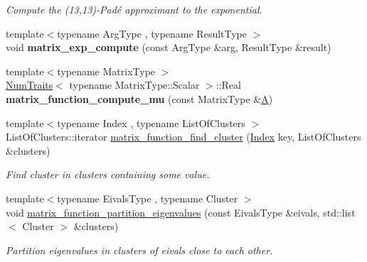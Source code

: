 \begin{DoxyCompactItemize}
\begin{DoxyCompactList}\small\item\em Compute the (13,13)-\/\+Pad\'{e} approximant to the exponential. \end{DoxyCompactList}\item 
\mbox{\label{namespace_eigen_1_1internal_a273f8391f1a757866c98b8e68875325e}} 
{\footnotesize template$<$typename Arg\+Type , typename Result\+Type $>$ }\\void {\bfseries matrix\+\_\+exp\+\_\+compute} (const Arg\+Type \&arg, Result\+Type \&result)
\item 
\mbox{\label{namespace_eigen_1_1internal_ab3539c07483b254013d986fad96d2832}} 
{\footnotesize template$<$typename Matrix\+Type $>$ }\\\hyperlink{group___core___module_struct_eigen_1_1_num_traits}{Num\+Traits}$<$ typename Matrix\+Type\+::\+Scalar $>$\+::Real {\bfseries matrix\+\_\+function\+\_\+compute\+\_\+mu} (const Matrix\+Type \&\hyperlink{group___core___module_class_eigen_1_1_matrix}{A})
\item 
{\footnotesize template$<$typename Index , typename List\+Of\+Clusters $>$ }\\List\+Of\+Clusters\+::iterator \hyperlink{namespace_eigen_1_1internal_af9cdbae9f4f166fae876c54b97c0f2bb}{matrix\+\_\+function\+\_\+find\+\_\+cluster} (\hyperlink{namespace_eigen_a62e77e0933482dafde8fe197d9a2cfde}{Index} key, List\+Of\+Clusters \&clusters)
\begin{DoxyCompactList}\small\item\em Find cluster in {\ttfamily clusters} containing some value. \end{DoxyCompactList}\item 
{\footnotesize template$<$typename Eivals\+Type , typename Cluster $>$ }\\void \hyperlink{namespace_eigen_1_1internal_a9291a6ab4fe0ad1346049a8f2feddeaa}{matrix\+\_\+function\+\_\+partition\+\_\+eigenvalues} (const Eivals\+Type \&eivals, std\+::list$<$ Cluster $>$ \&clusters)
\begin{DoxyCompactList}\small\item\em Partition eigenvalues in clusters of ei\textquotesingle{}vals close to each other. \end{DoxyCompactList}\item 
\mbox{\label{namespace_eigen_1_1internal_a1073ba7ac499827baa04c814e4251326}} 

\end{DoxyCompactItemize}
